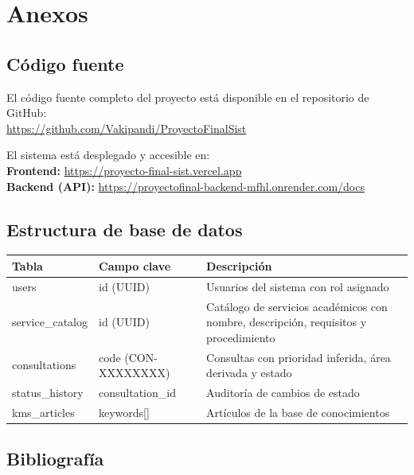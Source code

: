 \documentclass[12pt,a4paper]{article}
\begin{document}
	\newpage

	\section{Anexos}

	\subsection{Código fuente}
	El código fuente completo del proyecto está disponible en el repositorio de GitHub:\\
	\url{https://github.com/Vakipandi/ProyectoFinalSist}

	El sistema está desplegado y accesible en:\\
	\textbf{Frontend:} \url{https://proyecto-final-sist.vercel.app}\\
	\textbf{Backend (API):} \url{https://proyectofinal-backend-mfhl.onrender.com/docs}

	\subsection{Estructura de base de datos}

	\begin{longtable}{p{3cm} p{3cm} p{7cm}}
	\toprule
	\textbf{Tabla} & \textbf{Campo clave} & \textbf{Descripción} \\
	\midrule
	users & id (UUID) & Usuarios del sistema con rol asignado \\
	service\_catalog & id (UUID) & Catálogo de servicios académicos con nombre, descripción, requisitos y procedimiento \\
	consultations & code (CON-XXXXXXXX) & Consultas con prioridad inferida, área derivada y estado \\
	status\_history & consultation\_id & Auditoría de cambios de estado \\
	kms\_articles & keywords[] & Artículos de la base de conocimientos \\
	\bottomrule
	\end{longtable}

	\subsection{Bibliografía}
\end{document}
